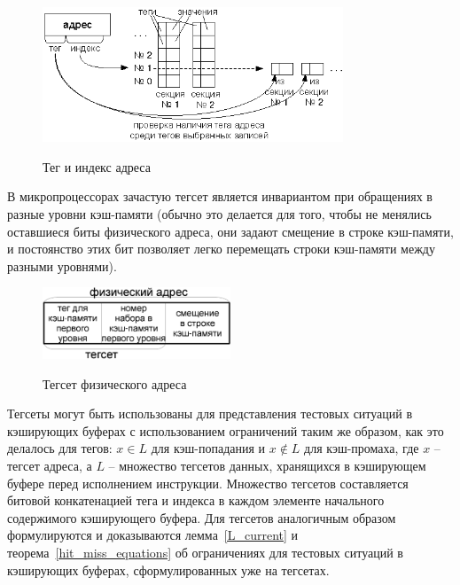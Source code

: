 \begin{figure}[h] \center
  \includegraphics[width=0.8\textwidth]{2.theor/cache_operation}\\
  \caption{Тег и индекс адреса}\label{cache_operation}
\end{figure}

В микропроцессорах зачастую тегсет является инвариантом при
обращениях в разные уровни кэш-памяти (обычно это делается для того,
чтобы не менялись оставшиеся биты физического адреса, они задают
смещение в строке кэш-памяти, и постоянство этих бит позволяет легко
перемещать строки кэш-памяти между разными уровнями).

\begin{figure}[h] \center
  \includegraphics[width=0.5\textwidth]{2.theor/tagset}\\
  \caption{Тегсет физического адреса}\label{tagset}
\end{figure}

Тегсеты могут быть использованы для представления тестовых ситуаций
в кэширующих буферах с использованием ограничений таким же образом,
как это делалось для тегов: $x \in L$ для кэш-попадания и $x \notin
L$ для кэш-промаха, где $x$ -- тегсет адреса, а $L$ -- множество
тегсетов данных, хранящихся в кэширующем буфере перед исполнением
инструкции. Множество тегсетов составляется битовой конкатенацией
тега и индекса в каждом элементе начального содержимого кэширующего
буфера. Для тегсетов аналогичным образом формулируются и
доказываются лемма~\ref{L_current} и
теорема~\ref{hit_miss_equations} об ограничениях для тестовых
ситуаций в кэширующих буферах, сформулированных уже на тегсетах.

